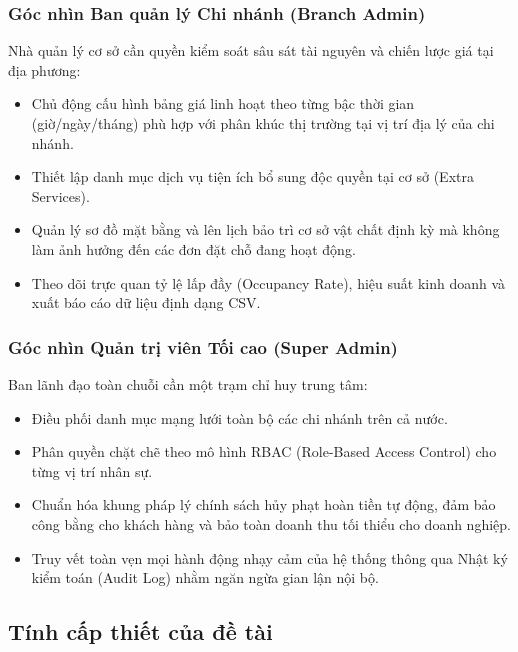 \subsubsection{Góc nhìn Ban quản lý Chi nhánh (Branch Admin)}
Nhà quản lý cơ sở cần quyền kiểm soát sâu sát tài nguyên và chiến lược giá tại địa phương:
\begin{itemize}
    \item Chủ động cấu hình bảng giá linh hoạt theo từng bậc thời gian (giờ/ngày/tháng) phù hợp với phân khúc thị trường tại vị trí địa lý của chi nhánh.
    \item Thiết lập danh mục dịch vụ tiện ích bổ sung độc quyền tại cơ sở (Extra Services).
    \item Quản lý sơ đồ mặt bằng và lên lịch bảo trì cơ sở vật chất định kỳ mà không làm ảnh hưởng đến các đơn đặt chỗ đang hoạt động.
    \item Theo dõi trực quan tỷ lệ lấp đầy (Occupancy Rate), hiệu suất kinh doanh và xuất báo cáo dữ liệu định dạng CSV.
\end{itemize}

\subsubsection{Góc nhìn Quản trị viên Tối cao (Super Admin)}
Ban lãnh đạo toàn chuỗi cần một trạm chỉ huy trung tâm:
\begin{itemize}
    \item Điều phối danh mục mạng lưới toàn bộ các chi nhánh trên cả nước.
    \item Phân quyền chặt chẽ theo mô hình RBAC (Role-Based Access Control) cho từng vị trí nhân sự.
    \item Chuẩn hóa khung pháp lý chính sách hủy phạt hoàn tiền tự động, đảm bảo công bằng cho khách hàng và bảo toàn doanh thu tối thiểu cho doanh nghiệp.
    \item Truy vết toàn vẹn mọi hành động nhạy cảm của hệ thống thông qua Nhật ký kiểm toán (Audit Log) nhằm ngăn ngừa gian lận nội bộ.
\end{itemize}

\subsection{Tính cấp thiết của đề tài}

